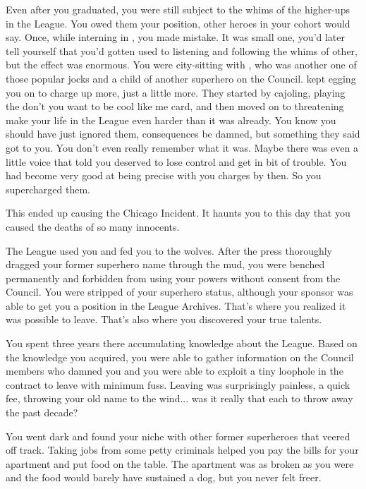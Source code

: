 \documentclass[char]{LRSguildcamp1}
\begin{document}
Even after you graduated, you were still subject to the whims of the higher-ups in the League. You owed them your position, other heroes in your cohort would say. Once, while interning in \pCityO{}, you made  mistake. It was small one, you'd later tell yourself that you'd gotten used to listening and following the whims of other, but the effect was enormous. You were city-sitting with  \cJuggernaut{}, who was another one of those popular jocks and a child of another superhero on the Council. \cJuggernaut{} kept egging you on to charge \cJuggernaut{\them} up more, just a little more. They started by cajoling, playing the don't you want to be cool like me card, and then moved on to threatening make your life in the League even harder than it was already. You know you should have just ignored them, consequences be damned, but something they said got to you. You don't even really remember what it was. Maybe there was even a little voice that told you \cJuggernaut{} deserved to lose control and get in bit of trouble. You had become very good at being precise with you charges by then. So you supercharged them.  

This ended up causing the Chicago Incident. It haunts you to this day that you caused the deaths of so many innocents. 

The League used you and fed you to the wolves. After the press thoroughly dragged your former superhero name through the mud, you were benched permanently and forbidden from using your powers without consent from the Council. You were stripped of your superhero status, although your sponsor was able to get you a position in the League Archives. That's where you realized it was possible to leave. That's also where you discovered your true talents. 

You spent three years there accumulating knowledge about the League. Based on the knowledge you acquired, you were able to gather information on the Council members who damned you and you were able to exploit a tiny loophole in the contract to leave with minimum fuss.  Leaving was surprisingly painless, a quick fee, throwing your old name to the wind... was it really that each to throw away the past decade?  

You went dark and found your niche with other former superheroes that veered off track. Taking jobs from some petty criminals helped you pay the bills for your apartment and put food on the table. The apartment was as broken as you were and the food would barely have sustained a dog, but you never felt freer. 
\end{document}
